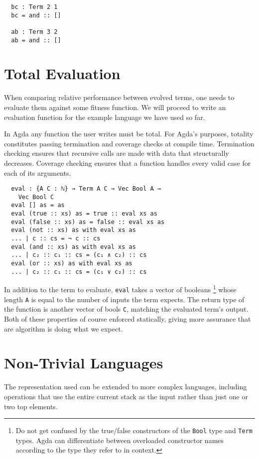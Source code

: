 \documentclass{acm_proc_article-sp}
\begin{document}
\begin{verbatim}
  bc : Term 2 1
  bc = and :: []

  ab : Term 3 2
  ab = and :: []
\end{verbatim}

\section{Total Evaluation}

When comparing relative performance between evolved terms, one needs
to evaluate them against some fitness function. We will proceed to write
an evaluation function for the example language we have used so far.

In Agda any function the user writes must be total. For Agda's
purposes, totality constitutes passing termination and coverage checks
at compile time. Termination checking ensures that recursive calls are
made with data that structurally decreases. Coverage checking ensures
that a function handles every valid case for each of its arguments.

\begin{verbatim}
  eval : {A C : ℕ} → Term A C → Vec Bool A →
    Vec Bool C
  eval [] as = as
  eval (true :: xs) as = true :: eval xs as
  eval (false :: xs) as = false :: eval xs as
  eval (not :: xs) as with eval xs as
  ... | c :: cs = ¬ c :: cs
  eval (and :: xs) as with eval xs as
  ... | c₂ :: c₁ :: cs = (c₁ ∧ c₂) :: cs
  eval (or :: xs) as with eval xs as
  ... | c₂ :: c₁ :: cs = (c₁ ∨ c₂) :: cs
\end{verbatim}

In addition to the term to evaluate, \texttt{eval} takes a vector of
booleans \footnote{Do not get confused by the true/false constructors
  of the \texttt{Bool} type and \texttt{Term} types. Agda can
  differentiate between overloaded constructor names according to the
  type they refer to in context.}
whose length \texttt{A} is equal to the number of inputs the
term expects. The return type of the function is another vector of
bools \texttt{C}, matching the evaluated term's output. Both of these
properties of course enforced statically, giving more assurance that
are algorithm is doing what we expect.

\section{Non-Trivial Languages}

The representation used can be extended to more complex languages,
including operations that use the entire current stack as the input
rather than just one or two top elements.
\end{document}
